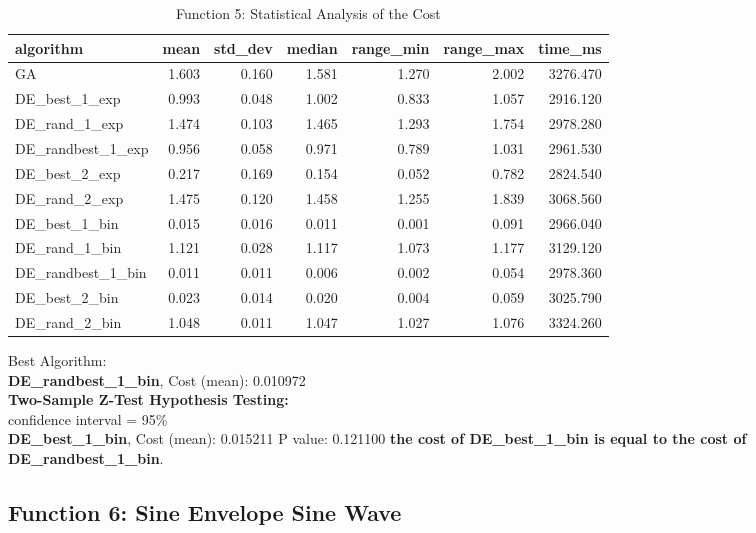 \documentclass[12pt]{article}
\begin{document}
\begin{table}[H]
    \centering
    \footnotesize
\begin{tabular}{lrrrrrr}
\toprule
         algorithm &  mean &  std\_dev &  median &  range\_min &  range\_max &  time\_ms \\
\midrule
                GA & 1.603 &    0.160 &   1.581 &      1.270 &      2.002 & 3276.470 \\
     DE\_best\_1\_exp & 0.993 &    0.048 &   1.002 &      0.833 &      1.057 & 2916.120 \\
     DE\_rand\_1\_exp & 1.474 &    0.103 &   1.465 &      1.293 &      1.754 & 2978.280 \\
 DE\_randbest\_1\_exp & 0.956 &    0.058 &   0.971 &      0.789 &      1.031 & 2961.530 \\
     DE\_best\_2\_exp & 0.217 &    0.169 &   0.154 &      0.052 &      0.782 & 2824.540 \\
     DE\_rand\_2\_exp & 1.475 &    0.120 &   1.458 &      1.255 &      1.839 & 3068.560 \\
     DE\_best\_1\_bin & 0.015 &    0.016 &   0.011 &      0.001 &      0.091 & 2966.040 \\
     DE\_rand\_1\_bin & 1.121 &    0.028 &   1.117 &      1.073 &      1.177 & 3129.120 \\
 DE\_randbest\_1\_bin & 0.011 &    0.011 &   0.006 &      0.002 &      0.054 & 2978.360 \\
     DE\_best\_2\_bin & 0.023 &    0.014 &   0.020 &      0.004 &      0.059 & 3025.790 \\
     DE\_rand\_2\_bin & 1.048 &    0.011 &   1.047 &      1.027 &      1.076 & 3324.260 \\
\bottomrule
\end{tabular}

\caption{Function 5: Statistical Analysis of the Cost} 
    \end{table}
Best Algorithm: \\
\textbf{DE\_randbest\_1\_bin}, Cost (mean): 0.010972\\
\noindent
\textbf{Two-Sample Z-Test Hypothesis Testing:}\\
confidence interval = 95\%\\
\textbf{DE\_best\_1\_bin}, Cost (mean): 0.015211
 P value: 0.121100   
\textbf{the cost of DE\_best\_1\_bin is equal to the cost of DE\_randbest\_1\_bin}.\\
\subsection{Function 6: Sine Envelope Sine Wave}
\end{document}

